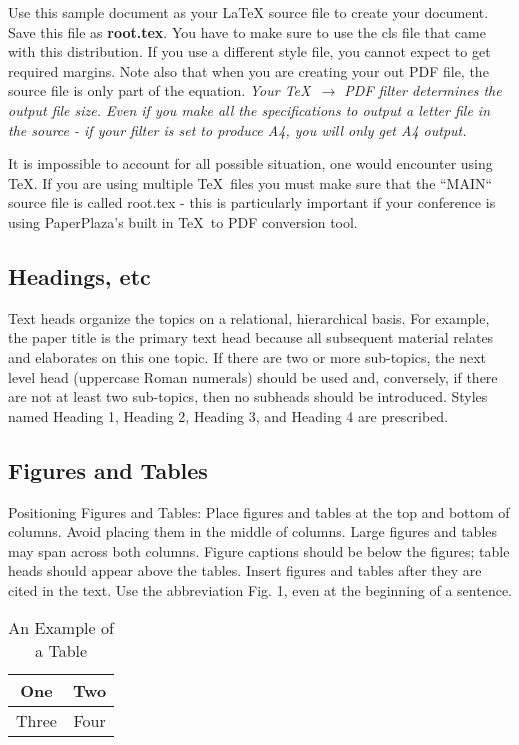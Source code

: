\documentclass[letterpaper, 10 pt, conference]{ieeeconf}  %
\begin{document}
Use this sample document as your LaTeX source file to create your document. Save this file as {\bf root.tex}. You have to make sure to use the cls file that came with this distribution. If you use a different style file, you cannot expect to get required margins. Note also that when you are creating your out PDF file, the source file is only part of the equation. {\it Your \TeX\ $\rightarrow$ PDF filter determines the output file size. Even if you make all the specifications to output a letter file in the source - if your filter is set to produce A4, you will only get A4 output. }

It is impossible to account for all possible situation, one would encounter using \TeX. If you are using multiple \TeX\ files you must make sure that the ``MAIN`` source file is called root.tex - this is particularly important if your conference is using PaperPlaza's built in \TeX\ to PDF conversion tool.

\subsection{Headings, etc}

Text heads organize the topics on a relational, hierarchical basis. For example, the paper title is the primary text head because all subsequent material relates and elaborates on this one topic. If there are two or more sub-topics, the next level head (uppercase Roman numerals) should be used and, conversely, if there are not at least two sub-topics, then no subheads should be introduced. Styles named Heading 1, Heading 2, Heading 3, and Heading 4 are prescribed.

\subsection{Figures and Tables}

Positioning Figures and Tables: Place figures and tables at the top and bottom of columns. Avoid placing them in the middle of columns. Large figures and tables may span across both columns. Figure captions should be below the figures; table heads should appear above the tables. Insert figures and tables after they are cited in the text. Use the abbreviation Fig. 1, even at the beginning of a sentence.

\begin{table}[h]
\caption{An Example of a Table}
\label{table_example}
\begin{center}
\begin{tabular}{|c||c|}
\hline
One & Two\\
\hline
Three & Four\\
\hline
\end{tabular}
\end{center}
\end{table}
\end{document}
